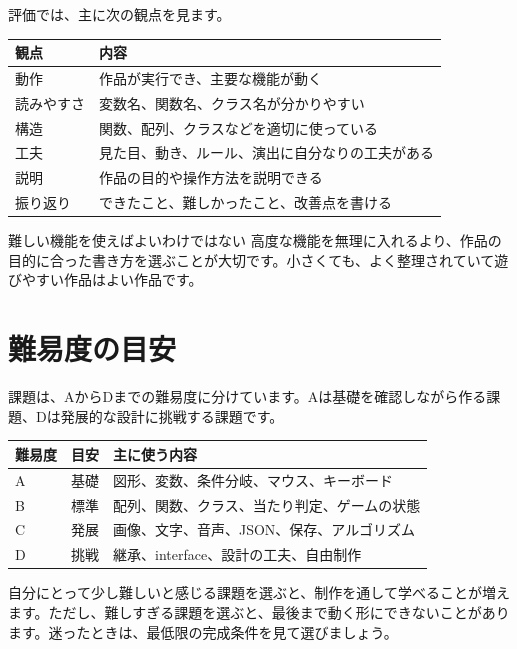 評価では、主に次の観点を見ます。

\begin{center}
\begin{tabular}{ll}
\toprule
観点 & 内容 \\
\midrule
動作 & 作品が実行でき、主要な機能が動く \\
読みやすさ & 変数名、関数名、クラス名が分かりやすい \\
構造 & 関数、配列、クラスなどを適切に使っている \\
工夫 & 見た目、動き、ルール、演出に自分なりの工夫がある \\
説明 & 作品の目的や操作方法を説明できる \\
振り返り & できたこと、難しかったこと、改善点を書ける \\
\bottomrule
\end{tabular}
\end{center}

\begin{pointbox}{難しい機能を使えばよいわけではない}
高度な機能を無理に入れるより、作品の目的に合った書き方を選ぶことが大切です。小さくても、よく整理されていて遊びやすい作品はよい作品です。
\end{pointbox}

\section{難易度の目安}

課題は、AからDまでの難易度に分けています。Aは基礎を確認しながら作る課題、Dは発展的な設計に挑戦する課題です。

\begin{center}
\begin{tabular}{lll}
\toprule
難易度 & 目安 & 主に使う内容 \\
\midrule
A & 基礎 & 図形、変数、条件分岐、マウス、キーボード \\
B & 標準 & 配列、関数、クラス、当たり判定、ゲームの状態 \\
C & 発展 & 画像、文字、音声、JSON、保存、アルゴリズム \\
D & 挑戦 & 継承、interface、設計の工夫、自由制作 \\
\bottomrule
\end{tabular}
\end{center}

自分にとって少し難しいと感じる課題を選ぶと、制作を通して学べることが増えます。ただし、難しすぎる課題を選ぶと、最後まで動く形にできないことがあります。迷ったときは、最低限の完成条件を見て選びましょう。

